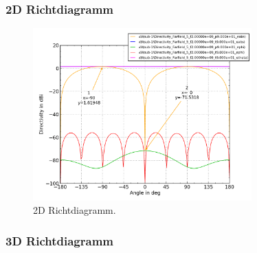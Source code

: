 \newpage
\subsubsection{2D Richtdiagramm}

\begin{figure}[h!]
	\centering
	\includegraphics[width=0.75\textwidth]{../fig/plt/monopol_a_sim_2d_pattern.png}
	\caption{2D Richtdiagramm.}
\end{figure}

\newpage
\subsubsection{3D Richtdiagramm}

